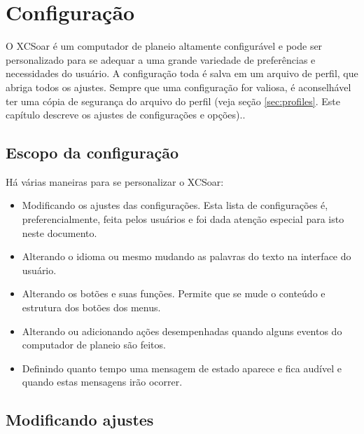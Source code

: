 \chapter{Configuração}\label{cha:configuration}\label{conf:configuration}
O XCSoar é um computador de planeio altamente configurável e pode ser personalizado para se adequar a uma grande variedade de preferências e necessidades do usuário.  A configuração toda é salva em um arquivo de perfil, que abriga todos os ajustes.  Sempre que uma configuração for valiosa, é aconselhável ter uma cópia de segurança do arquivo do perfil (veja seção \ref{sec:profiles}. Este capítulo descreve os ajustes de configurações e opções)..

\section{Escopo da configuração}

Há várias maneiras para se personalizar o XCSoar:
\begin{itemize}

\item Modificando os ajustes das configurações.  Esta lista de configurações é, preferencialmente, feita pelos usuários e foi dada atenção especial para isto neste documento.
\item Alterando o idioma ou mesmo mudando as palavras do texto na interface do usuário.
\item Alterando os botões e suas funções.  Permite que se mude o conteúdo e estrutura dos botões dos menus.
\item Alterando ou adicionando ações desempenhadas quando alguns eventos do computador de planeio são feitos.
\item Definindo quanto tempo uma mensagem de estado aparece e fica audível e quando estas mensagens irão ocorrer.
\end{itemize}

\section{Modificando ajustes}

